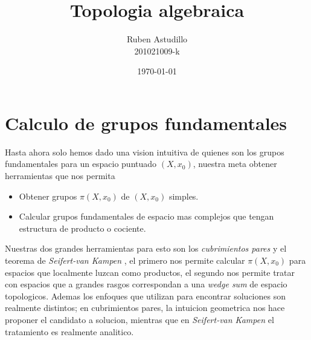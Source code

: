 \documentclass[letterpaper]{article}
\newcommand{\vank}{\emph{Seifert-van Kampen} }
\theoremstyle{definition}
\theoremstyle{plain}
\theoremstyle{plain}
\theoremstyle{plain}
\theoremstyle{remark}
\begin{document}
\title{Topologia algebraica}
\author{Ruben Astudillo \\ 201021009-k}
\date{\today}
\maketitle


\tableofcontents



\section{Calculo de grupos fundamentales}
Hasta ahora solo hemos dado una vision intuitiva de quienes son los
grupos fundamentales para un espacio puntuado \((X,x_0)\), nuestra meta
obtener herramientas que nos permita
\begin{itemize}
\item Obtener grupos \(\pi (X, x_0)\) de \((X,x_0)\) simples.
\item Calcular grupos fundamentales de espacio mas complejos que tengan
  estructura de producto o cociente.
\end{itemize}
Nuestras dos grandes herramientas para esto son los \emph{cubrimientos
  pares} y el teorema de \vank , el primero nos
permite calcular \(\pi (X, x_0)\) para espacios que localmente luzcan
como productos, el segundo nos permite tratar con espacios que a grandes
rasgos correspondan a una \emph{wedge sum} de espacio topologicos.
Ademas los enfoques que utilizan para encontrar soluciones son realmente
distintos; en cubrimientos pares, la intuicion geometrica nos hace
proponer el candidato a solucion, mientras que en \vank el tratamiento
es realmente analitico.



\end{document}
